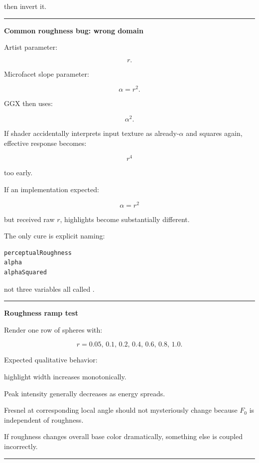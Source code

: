 then invert it.

\begin{center}\rule{0.5\linewidth}{0.5pt}\end{center}

\textbf{Common roughness bug: wrong domain}

Artist parameter:

\[
r.
\]

Microfacet slope parameter:

\[
\alpha=r^2.
\]

GGX then uses:

\[
\alpha^2.
\]

If shader accidentally interprets input texture as already-\(\alpha\) and squares again, effective response becomes:

\[
r^4
\]

too early.

If an implementation expected:

\[
\alpha=r^2
\]

but received raw \(r\), highlights become substantially different.

The only cure is explicit naming:

\begin{verbatim}
perceptualRoughness
alpha
alphaSquared
\end{verbatim}

not three variables all called .

\begin{center}\rule{0.5\linewidth}{0.5pt}\end{center}

\textbf{Roughness ramp test}

Render one row of spheres with:

\[
r=
0.05,\,
0.1,\,
0.2,\,
0.4,\,
0.6,\,
0.8,\,
1.0.
\]

Expected qualitative behavior:

highlight width increases monotonically.

Peak intensity generally decreases as energy spreads.

Fresnel at corresponding local angle should not mysteriously change because \(F_0\) is independent of roughness.

If roughness changes overall base color dramatically, something else is coupled incorrectly.

\begin{center}\rule{0.5\linewidth}{0.5pt}\end{center}


